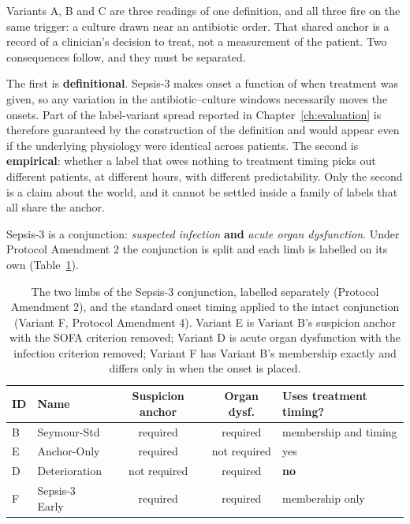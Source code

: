 Variants A, B and C are three readings of one definition, and all three fire on
the same trigger: a culture drawn near an antibiotic order. That shared anchor
is a record of a clinician's decision to treat, not a measurement of the
patient. Two consequences follow, and they must be separated.

The first is \textbf{definitional}. Sepsis-3 \cite{singer2016sepsis3} makes
onset a function of when treatment was given, so any variation in the
antibiotic--culture windows necessarily moves the onsets. Part of the
label-variant spread reported in Chapter~\ref{ch:evaluation} is therefore
guaranteed by the construction of the definition and would appear even if the
underlying physiology were identical across patients. The second is
\textbf{empirical}: whether a label that owes nothing to treatment timing picks
out different patients, at different hours, with different predictability. Only
the second is a claim about the world, and it cannot be settled inside a family
of labels that all share the anchor.

Sepsis-3 is a conjunction: \emph{suspected infection} \textbf{and}
\emph{acute organ dysfunction}. Under Protocol Amendment 2 the conjunction is
split and each limb is labelled on its own
(Table~\ref{tab:alt_label_variants}).

\begin{table}[H]
    \centering\small
    \begin{tabular}{llccp{3.1cm}}
        \toprule
        \textbf{ID} & \textbf{Name} & \textbf{Suspicion anchor}
        & \textbf{Organ dysf.} & \textbf{Uses treatment timing?} \\
        \midrule
        B & Seymour-Std    & required     & required     & \raggedright membership and timing\tabularnewline
        E & Anchor-Only    & required     & not required & \raggedright yes\tabularnewline
        D & Deterioration  & not required & required     & \raggedright \textbf{no}\tabularnewline
        F & Sepsis-3 Early & required     & required     & \raggedright membership only\tabularnewline
        \bottomrule
    \end{tabular}
    \caption{The two limbs of the Sepsis-3 conjunction, labelled separately
    (Protocol Amendment 2), and the standard onset timing applied to the intact
    conjunction (Variant F, Protocol Amendment 4). Variant E is Variant B's
    suspicion anchor with the SOFA criterion removed; Variant D is acute organ
    dysfunction with the infection criterion removed; Variant F has Variant B's
    membership exactly and differs only in when the onset is placed.}
    \label{tab:alt_label_variants}
\end{table}

